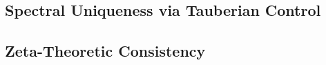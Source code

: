 \subsection{Spectral Uniqueness via Tauberian Control}




\subsection{Zeta-Theoretic Consistency}






